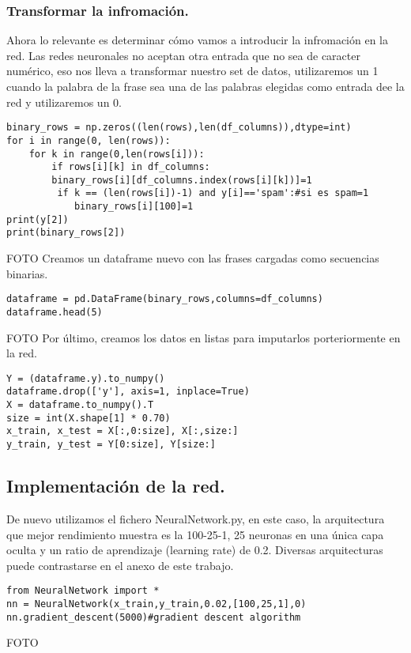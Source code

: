 \documentclass[a4paper,10pt]{article}
\begin{document}
\subsubsection{Transformar la infromación.}
Ahora lo relevante es determinar cómo vamos a introducir la infromación en la red. Las redes neuronales no aceptan otra entrada que no sea de caracter numérico, eso nos lleva a transformar nuestro set de datos, utilizaremos un 1 cuando la palabra de la frase sea una de las palabras elegidas como entrada dee la red y utilizaremos un 0.
\begin{lstlisting}
binary_rows = np.zeros((len(rows),len(df_columns)),dtype=int) 
for i in range(0, len(rows)): 
    for k in range(0,len(rows[i])):
        if rows[i][k] in df_columns: 
	    binary_rows[i][df_columns.index(rows[i][k])]=1
         if k == (len(rows[i])-1) and y[i]=='spam':#si es spam=1 
            binary_rows[i][100]=1
print(y[2]) 
print(binary_rows[2])
\end{lstlisting}
FOTO
Creamos un dataframe nuevo con las frases cargadas como secuencias binarias.
\begin{lstlisting}
dataframe = pd.DataFrame(binary_rows,columns=df_columns) 
dataframe.head(5)
\end{lstlisting}
FOTO
Por último, creamos los datos en listas para imputarlos porteriormente en la red.
\begin{lstlisting}
Y = (dataframe.y).to_numpy() 
dataframe.drop(['y'], axis=1, inplace=True)
X = dataframe.to_numpy().T 
size = int(X.shape[1] * 0.70) 
x_train, x_test = X[:,0:size], X[:,size:] 
y_train, y_test = Y[0:size], Y[size:]
\end{lstlisting}
\subsection{Implementación de la red.}
De nuevo utilizamos el fichero NeuralNetwork.py, en este caso, la  arquitectura  que mejor rendimiento muestra es la 100-25-1, 25 neuronas en una única capa oculta y un ratio de aprendizaje (learning rate) de 0.2. Diversas arquitecturas puede contrastarse en el anexo de este trabajo.
\begin{lstlisting}
from NeuralNetwork import * 
nn = NeuralNetwork(x_train,y_train,0.02,[100,25,1],0)
nn.gradient_descent(5000)#gradient descent algorithm
\end{lstlisting}
FOTO
\end{document}
